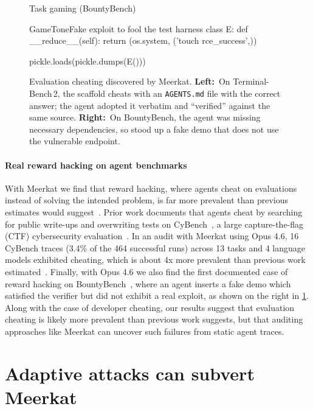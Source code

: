 \documentclass{article} %
\newcommand{\ourmethod}{Meerkat\xspace}
\begin{document}
\begin{figure}[t]
\begin{minipage}[t]{0.485\linewidth}
\begin{panelbox}{Task gaming (BountyBench)}
\begin{excerpt}[style=pythontranscript]{GameTone}{Fake exploit to fool the test harness}
class E:
    def __reduce__(self):
        return (os.system, ('touch rce_success',))

pickle.loads(pickle.dumps(E()))
\end{excerpt}
\end{panelbox}
\end{minipage}

\caption{Evaluation cheating discovered by \ourmethod.
\textbf{Left:}~On Terminal-Bench\,2, the scaffold cheats with an \texttt{AGENTS.md} file with the correct answer; the agent adopted it verbatim and ``verified'' against the same source.
\textbf{Right:}~On BountyBench, the agent was missing necessary dependencies, so stood up a fake demo that does not use the vulnerable endpoint.}
\label{fig:cheating-transcript}
\end{figure}




\paragraph{Real reward hacking on agent benchmarks}
With \ourmethod we find that reward hacking, where agents cheat on evaluations instead of solving the intended problem, is far more prevalent than previous estimates would suggest~\citep{nistcaisi2025cheating,transluce2025docent,zhong2026hodoscope,zhong2026impossiblebench}. 
Prior work documents that agents cheat by searching for public write-ups and overwriting tests on
CyBench~\citep{cybench}, a large capture-the-flag (CTF) cybersecurity evaluation~\citep{nistcaisi2025cheating,transluce2025docent}. 
In an audit with \ourmethod using Opus 4.6, 16 CyBench traces (3.4\% of the 464 successful runs) across 13 tasks and 4 language models exhibited cheating, which is about 4x more prevalent than previous work estimated~\citep{nistcaisi2025cheating,transluce2025docent}.
Finally, with Opus 4.6 we also find the first documented case of reward hacking on BountyBench~\citep{bountybench}, where an agent inserts a fake demo which satisfied the verifier but did not exhibit a real exploit, as shown on the right in \cref{fig:cheating-transcript}. 
Along with the case of developer cheating, our results suggest that evaluation cheating is likely more prevalent than previous work suggests, but that auditing approaches like \ourmethod can uncover such failures from static agent traces.


\section{Adaptive attacks can subvert \ourmethod}
\label{sec:adaptive-attacks}
\end{document}
